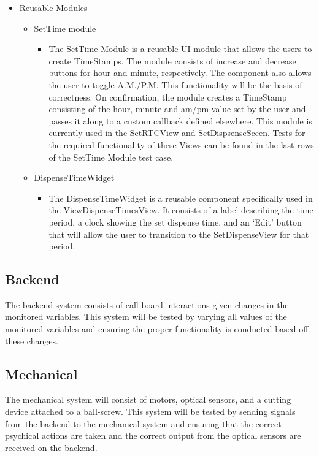 \documentclass[12pt]{article}
\begin{document}
\begin{itemize}
        \item Reusable Modules
        \begin{itemize}
            \item  SetTime module
            \begin{itemize}
                \item  The SetTime Module is a reusable UI module that allows the users to create TimeStamps. The module consists of increase and decrease buttons for hour and minute, respectively. The component also allows the user to toggle A.M./P.M. This functionality will be the basis of correctness. On confirmation, the module creates a TimeStamp consisting of the hour, minute and am/pm value set by the user and passes it along to a custom callback defined elsewhere. This module is currently used in the SetRTCView and SetDispsenseSceen. Tests for the required functionality of these Views can be found in the last rows of the SetTime Module test case.

            \end{itemize}
            
            \item DispenseTimeWidget
            \begin{itemize}
                \item The DispenseTimeWidget is a reusable component specifically used in the ViewDispenseTimesView. It consists of a label describing the time period, a clock showing the set dispense time, and an `Edit' button that will allow the user to transition to the SetDispenseView for that period. 
            \end{itemize}
        \end{itemize}
        \end{itemize}
        
\subsection{Backend}
The backend system consists of call board interactions given changes in the monitored variables. This system will be tested by varying all values of the monitored variables and ensuring the proper functionality is conducted based off these changes.

\subsection{Mechanical}
The mechanical system will consist of motors, optical sensors, and a cutting device attached to a ball-screw. This system will be tested by sending signals from the backend to the mechanical system and ensuring that the correct psychical actions are taken and the correct output from the optical sensors are received on the backend.
\end{document}
